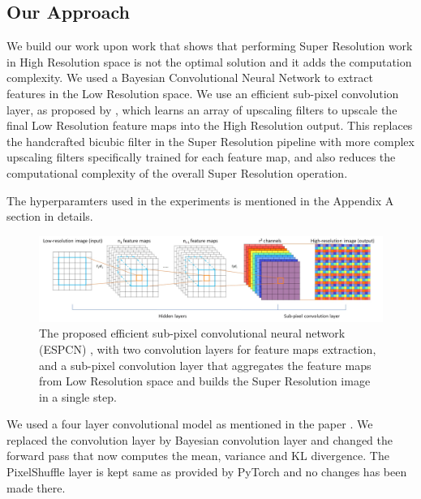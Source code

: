 \subsection{Our Approach}

We build our work upon \citet{DBLP:journals/corr/ShiCHTABRW16} work that shows that performing Super Resolution work in High Resolution space is not the optimal solution and it adds the computation complexity. We used a Bayesian Convolutional Neural Network to extract features in the Low Resolution space. We use an efficient sub-pixel convolution layer, as proposed by \citet{DBLP:journals/corr/ShiCHTABRW16}, which learns an array of upscaling filters to upscale the final Low Resolution feature maps into the High Resolution output. This replaces the handcrafted bicubic filter in the Super Resolution pipeline with more complex upscaling filters specifically trained for each feature map, and also reduces the computational complexity of the overall Super Resolution operation.

The hyperparamters used in the experiments is mentioned in the Appendix A section in details.

\begin{figure}[htbp]
\begin{center}
\includegraphics[width=1.0\linewidth]{Chapter6/Figs/networkstructure.jpg}
\caption{The proposed efficient sub-pixel convolutional neural network (ESPCN) \cite{DBLP:journals/corr/ShiCHTABRW16}, with two convolution layers for feature maps extraction, and a sub-pixel convolution layer that aggregates the feature maps from Low Resolution space and builds the Super Resolution image in a single step.}
\label{fig:networkstructure}
\end{center}
\end{figure}

We used a four layer convolutional model as mentioned in the paper \cite{DBLP:journals/corr/ShiCHTABRW16}. We replaced the convolution layer by Bayesian convolution layer and changed the forward pass that now computes the mean, variance and KL divergence. The PixelShuffle layer is kept same as provided by PyTorch and no changes has been made there.  

